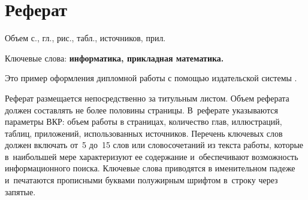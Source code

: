\documentclass[a4paper,12pt]{diplom}
\begin{document}












\maketitle

\chapter*{Реферат}

Объем  с.,  гл.,  рис.,
 табл.,  источников,  прил.

\medskip

Ключевые слова: \textbf{информатика, прикладная математика.}

\medskip

Это пример оформления дипломной работы с помощью издательской системы \LaTeXe.

Реферат размещается непосредственно за титульным листом. Объем реферата должен составлять не более половины страницы. В~реферате указываются параметры ВКР: объем работы в страницах, количество глав, иллюстраций, таблиц, приложений, использованных источников. Перечень ключевых слов должен включать от~5 до~15 слов или словосочетаний из текста работы, которые в~наибольшей мере характеризуют ее содержание и~обеспечивают возможность информационного поиска. Ключевые слова приводятся в именительном падеже и~печатаются прописными буквами полужирным шрифтом в~строку через запятые.
\end{document}
